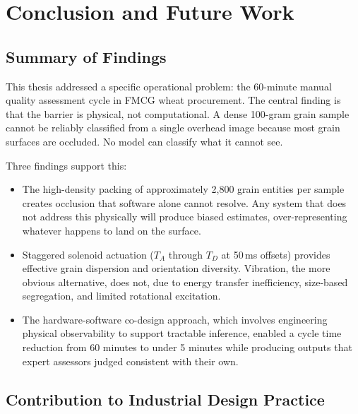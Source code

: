 
\chapter{Conclusion and Future Work}\doublespacing
\label{Chapter9}

\section{Summary of Findings}

This thesis addressed a specific operational problem: the 60-minute manual quality assessment cycle in FMCG wheat procurement. The central finding is that the barrier is physical, not computational. A dense 100-gram grain sample cannot be reliably classified from a single overhead image because most grain surfaces are occluded. No model can classify what it cannot see.

Three findings support this:

\begin{itemize}
    \item The high-density packing of approximately 2,800 grain entities per sample creates occlusion that software alone cannot resolve. Any system that does not address this physically will produce biased estimates, over-representing whatever happens to land on the surface.
    \item Staggered solenoid actuation ($T_A$ through $T_D$ at 50\,ms offsets) provides effective grain dispersion and orientation diversity. Vibration, the more obvious alternative, does not, due to energy transfer inefficiency, size-based segregation, and limited rotational excitation.
    \item The hardware-software co-design approach, which involves engineering physical observability to support tractable inference, enabled a cycle time reduction from 60 minutes to under 5 minutes while producing outputs that expert assessors judged consistent with their own.
\end{itemize}

\section{Contribution to Industrial Design Practice}

